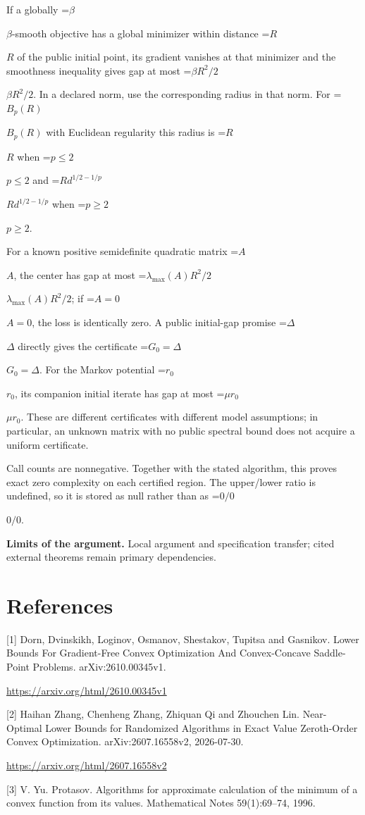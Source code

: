 \documentclass[10pt,a4paper]{article}
\newcommand{\AtlasMath}[1]{\par\begingroup\centering\setbox0=\hbox{$\displaystyle #1$}\ifdim\wd0>1.4\linewidth\typeout{ATLAS WIDE FORMULA: \the\wd0}\fi\ifdim\wd0>\linewidth\resizebox{\linewidth}{!}{\box0}\else\box0\fi\par\endgroup}
\newcommand{\AtlasInlineMath}[1]{\begingroup\setbox0=\hbox{$#1$}\ifdim\wd0>.4\linewidth\endgroup\AtlasMath{#1}\else\endgroup$#1$\fi}
\begin{document}
If a globally \AtlasInlineMath{\beta}-smooth objective has a global minimizer within distance \AtlasInlineMath{R} of the public initial point, its gradient vanishes at that minimizer and the smoothness inequality gives gap at most \AtlasInlineMath{\beta R^2/2}. In a declared norm, use the corresponding radius in that norm. For \AtlasInlineMath{B_p(R)} with Euclidean regularity this radius is \AtlasInlineMath{R} when \AtlasInlineMath{p\le2} and \AtlasInlineMath{R d^{1/2-1/p}} when \AtlasInlineMath{p\ge2}.

For a known positive semidefinite quadratic matrix \AtlasInlineMath{A}, the center has gap at most \AtlasInlineMath{\lambda_{\max}(A)R^2/2}; if \AtlasInlineMath{A=0}, the loss is identically zero. A public initial-gap promise \AtlasInlineMath{\Delta} directly gives the certificate \AtlasInlineMath{G_0=\Delta}. For the Markov potential \AtlasInlineMath{r_0}, its companion initial iterate has gap at most \AtlasInlineMath{\mu r_0}. These are different certificates with different model assumptions; in particular, an unknown matrix with no public spectral bound does not acquire a uniform certificate.

Call counts are nonnegative. Together with the stated algorithm, this proves exact zero complexity on each certified region. The upper/lower ratio is undefined, so it is stored as null rather than as \AtlasInlineMath{0/0}.

\textbf{Limits of the argument.} Local argument and specification transfer; cited external theorems remain primary dependencies.

\section{References}
[1] Dorn, Dvinskikh, Loginov, Osmanov, Shestakov, Tupitsa and Gasnikov. Lower Bounds For Gradient-Free Convex Optimization And Convex-Concave Saddle-Point Problems. arXiv:2610.00345v1.

\url{https://arxiv.org/html/2610.00345v1}

[2] Haihan Zhang, Chenheng Zhang, Zhiquan Qi and Zhouchen Lin. Near-Optimal Lower Bounds for Randomized Algorithms in Exact Value Zeroth-Order Convex Optimization. arXiv:2607.16558v2, 2026-07-30.

\url{https://arxiv.org/html/2607.16558v2}

[3] V. Yu. Protasov. Algorithms for approximate calculation of the minimum of a convex function from its values. Mathematical Notes 59(1):69--74, 1996.
\end{document}

